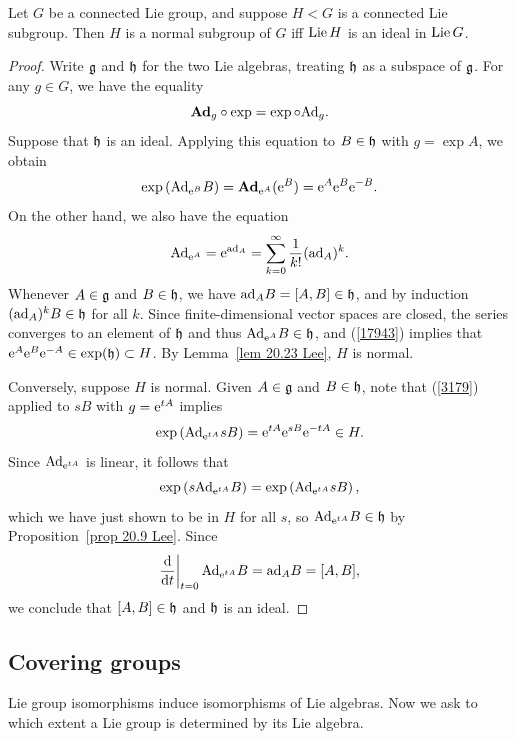 \begin{thm}\label{thm 20.28 Lee}
    Let $G$ be a connected Lie group, and suppose $H<G$ is a connected Lie subgroup. Then $H$ is a normal subgroup of $G$ iff $\operatorname{Lie} H$ is an ideal in $\operatorname{Lie} G$.
\end{thm}
\begin{proof}
    Write $\mathfrak{g}$ and $\mathfrak{h}$ for the two Lie algebras, treating $\mathfrak{h}$ as a subspace of $\mathfrak{g}$. For any $g\in G$, we have the equality \[\mathrm{\mathbf{Ad}}_g\circ \exp=\exp\circ \mathrm{Ad}_g.\label{3179}\]
    Suppose that $\mathfrak{h}$ is an ideal. Applying this equation to $B\in\mathfrak{h}$ with $g=\exp A$, we obtain
    \[\exp\left(\mathrm{Ad}_{\mathrm{e}^B}B\right)=\mathrm{\mathbf{Ad}}_{\mathrm{e}^A}(\mathrm{e}^B)=\mathrm{e}^A \mathrm{e}^B \mathrm{e}^{-B}.\label{17943}\]
    On the other hand, we also have the equation
    \[\mathrm{Ad}_{\mathrm{e}^A}=\mathrm{e}^{\mathrm{ad}_A}=\sum_{k=0}^\infty \frac{1}{k!}(\mathrm{ad}_A)^k.\]
    Whenever $A\in\mathfrak{g}$ and $B\in\mathfrak{h}$, we have $\mathrm{ad}_A B=[A,B]\in\mathfrak{h}$, and by induction $(\mathrm{ad}_A)^k B\in \mathfrak{h}$ for all $k$. Since finite-dimensional vector spaces are closed, the series converges to an element of $\mathfrak{h}$ and thus $\mathrm{Ad}_{\mathrm{e}^A}B\in\mathfrak{h}$, and (\ref{17943}) implies that $\mathrm{e}^A \mathrm{e}^B \mathrm{e}^{-A}\in \exp (\mathfrak{h})\subset H $. By Lemma~\ref{lem 20.23 Lee}, $H$ is normal.

    Conversely, suppose $H$ is normal. Given $A\in\mathfrak{g}$ and $B\in\mathfrak{h}$, note that (\ref{3179}) applied to $sB$ with $g=\mathrm{e}^{tA}$ implies
    \[\exp\left(\mathrm{Ad}_{\mathrm{e}^{tA}} sB\right)=\mathrm{e}^{tA}\mathrm{e}^{sB}\mathrm{e}^{-tA}\in H.\]
    Since $\mathrm{Ad}_{\mathrm{e}^{tA}}$ is linear, it follows that
    \[\exp\left(s\mathrm{Ad}_{\mathrm{e}^{tA}}B\right)=\exp\left(\mathrm{Ad}_{\mathrm{e}^{tA}}sB\right),\]
    which we have just shown to be in $H$ for all $s$, so $\mathrm{Ad}_{\mathrm{e}^{tA}}B\in\mathfrak{h}$ by Proposition~\ref{prop 20.9 Lee}. Since
    \[\restr{\frac{\dd}{\dd t}}{t=0}\Ad_{\rme^{tA}}B=\ad_A B=[A,B],\]
    we conclude that $[A,B]\in\mathfrak{h}$ and $\mathfrak{h}$ is an ideal.
\end{proof}









\subsection{Covering groups}


Lie group isomorphisms induce isomorphisms of Lie algebras. Now we ask to which extent a Lie group is determined by its Lie algebra.


